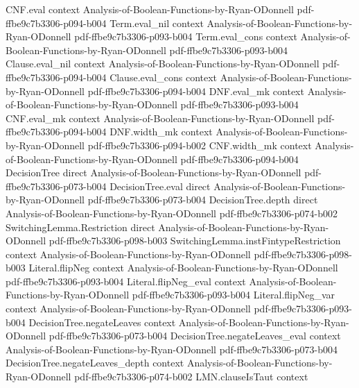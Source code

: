 \begin{lemma}
\proofstep
  {CNF.eval}
  {context}
  {Analysis-of-Boolean-Functions-by-Ryan-ODonnell}
  {pdf-ffbe9c7b3306-p094-b004}
\proofstep
  {Term.eval_nil}
  {context}
  {Analysis-of-Boolean-Functions-by-Ryan-ODonnell}
  {pdf-ffbe9c7b3306-p093-b004}
\proofstep
  {Term.eval_cons}
  {context}
  {Analysis-of-Boolean-Functions-by-Ryan-ODonnell}
  {pdf-ffbe9c7b3306-p093-b004}
\proofstep
  {Clause.eval_nil}
  {context}
  {Analysis-of-Boolean-Functions-by-Ryan-ODonnell}
  {pdf-ffbe9c7b3306-p094-b004}
\proofstep
  {Clause.eval_cons}
  {context}
  {Analysis-of-Boolean-Functions-by-Ryan-ODonnell}
  {pdf-ffbe9c7b3306-p094-b004}
\proofstep
  {DNF.eval_mk}
  {context}
  {Analysis-of-Boolean-Functions-by-Ryan-ODonnell}
  {pdf-ffbe9c7b3306-p093-b004}
\proofstep
  {CNF.eval_mk}
  {context}
  {Analysis-of-Boolean-Functions-by-Ryan-ODonnell}
  {pdf-ffbe9c7b3306-p094-b004}
\proofstep
  {DNF.width_mk}
  {context}
  {Analysis-of-Boolean-Functions-by-Ryan-ODonnell}
  {pdf-ffbe9c7b3306-p094-b002}
\proofstep
  {CNF.width_mk}
  {context}
  {Analysis-of-Boolean-Functions-by-Ryan-ODonnell}
  {pdf-ffbe9c7b3306-p094-b004}
\proofstep
  {DecisionTree}
  {direct}
  {Analysis-of-Boolean-Functions-by-Ryan-ODonnell}
  {pdf-ffbe9c7b3306-p073-b004}
\proofstep
  {DecisionTree.eval}
  {direct}
  {Analysis-of-Boolean-Functions-by-Ryan-ODonnell}
  {pdf-ffbe9c7b3306-p073-b004}
\proofstep
  {DecisionTree.depth}
  {direct}
  {Analysis-of-Boolean-Functions-by-Ryan-ODonnell}
  {pdf-ffbe9c7b3306-p074-b002}
\proofstep
  {SwitchingLemma.Restriction}
  {direct}
  {Analysis-of-Boolean-Functions-by-Ryan-ODonnell}
  {pdf-ffbe9c7b3306-p098-b003}
\proofstep
  {SwitchingLemma.instFintypeRestriction}
  {context}
  {Analysis-of-Boolean-Functions-by-Ryan-ODonnell}
  {pdf-ffbe9c7b3306-p098-b003}
\proofstep
  {Literal.flipNeg}
  {context}
  {Analysis-of-Boolean-Functions-by-Ryan-ODonnell}
  {pdf-ffbe9c7b3306-p093-b004}
\proofstep
  {Literal.flipNeg_eval}
  {context}
  {Analysis-of-Boolean-Functions-by-Ryan-ODonnell}
  {pdf-ffbe9c7b3306-p093-b004}
\proofstep
  {Literal.flipNeg_var}
  {context}
  {Analysis-of-Boolean-Functions-by-Ryan-ODonnell}
  {pdf-ffbe9c7b3306-p093-b004}
\proofstep
  {DecisionTree.negateLeaves}
  {context}
  {Analysis-of-Boolean-Functions-by-Ryan-ODonnell}
  {pdf-ffbe9c7b3306-p073-b004}
\proofstep
  {DecisionTree.negateLeaves_eval}
  {context}
  {Analysis-of-Boolean-Functions-by-Ryan-ODonnell}
  {pdf-ffbe9c7b3306-p073-b004}
\proofstep
  {DecisionTree.negateLeaves_depth}
  {context}
  {Analysis-of-Boolean-Functions-by-Ryan-ODonnell}
  {pdf-ffbe9c7b3306-p074-b002}
\proofstep
  {LMN.clauseIsTaut}
  {context}

\end{lemma}
